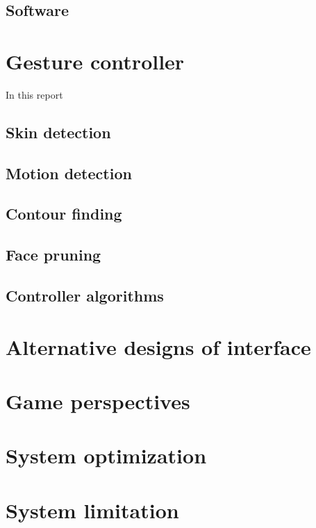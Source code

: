\documentclass[10pt,twocolumn,letterpaper]{article}
\begin{document}
\subsection{Software}

\section{Gesture controller}
In this report
\subsection{Skin detection}

\subsection{Motion detection}

\subsection{Contour finding}

\subsection{Face pruning}

\subsection{Controller algorithms}

\section{Alternative designs of interface}

\section{Game perspectives}

\section{System optimization}

\section{System limitation}
\end{document}
